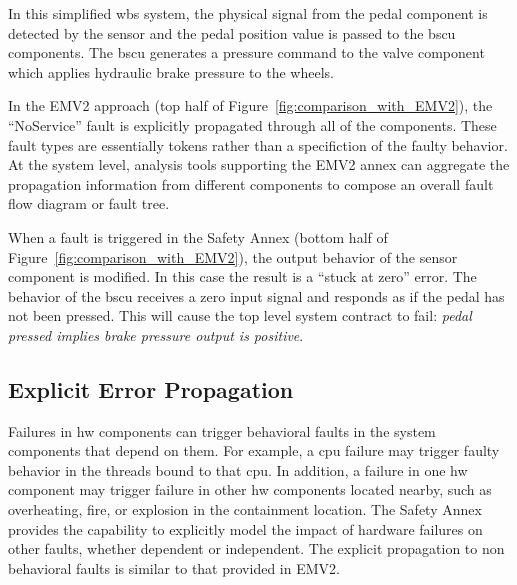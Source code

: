 In this simplified \gls{wbs} system, the physical signal from the pedal component is detected by the sensor and the pedal position value is passed to the \gls{bscu} components.  The \gls{bscu} generates a pressure command to the valve component which applies hydraulic brake pressure to the wheels. 

In the EMV2 approach (top half of Figure~\ref{fig:comparison_with_EMV2}), the ``NoService'' fault is explicitly propagated through all of the components. These fault types are essentially tokens rather than a specifiction of the faulty behavior. At the system level, analysis tools supporting the EMV2 annex can aggregate the propagation information from different components to compose an overall fault flow diagram or fault tree. 

When a fault is triggered in the Safety Annex (bottom half of Figure~\ref{fig:comparison_with_EMV2}), the output behavior of the sensor component is modified. In this case the result is a ``stuck at zero'' error. The behavior of the \gls{bscu} receives a zero input signal and responds as if the pedal has not been pressed. This will cause the top level system contract to fail: {\em pedal pressed implies brake pressure output is positive}.

\subsection{Explicit Error Propagation} 
\label{subsec:explicit}
Failures in \gls{hw} components can trigger behavioral faults in the system components that depend on them. For example, a \gls{cpu} failure may trigger faulty behavior in the threads bound to that \gls{cpu}. In addition, a failure in one \gls{hw} component may trigger failure in other \gls{hw} components located nearby, such as overheating, fire, or explosion
in the containment location. 
The Safety Annex provides the capability to explicitly model the impact of hardware failures on other faults, whether dependent or independent. The explicit propagation to non behavioral faults is similar to that provided in EMV2.

